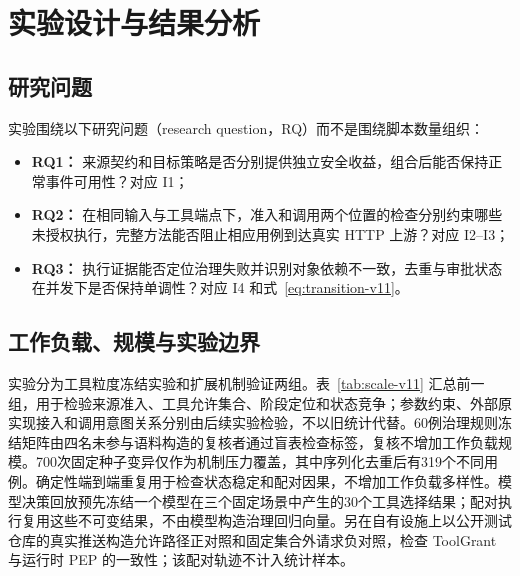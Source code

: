\section{实验设计与结果分析}\label{sec:evaluation-v11}

\subsection{研究问题}

实验围绕以下研究问题（research question，RQ）而不是围绕脚本数量组织：
\begin{itemize}
  \item \textbf{RQ1：} 来源契约和目标策略是否分别提供独立安全收益，组合后能否保持正常事件可用性？对应 I1；
  \item \textbf{RQ2：} 在相同输入与工具端点下，准入和调用两个位置的检查分别约束哪些未授权执行，完整方法能否阻止相应用例到达真实 HTTP 上游？对应 I2--I3；
  \item \textbf{RQ3：} 执行证据能否定位治理失败并识别对象依赖不一致，去重与审批状态在并发下是否保持单调性？对应 I4 和式~\eqref{eq:transition-v11}。
\end{itemize}

\subsection{工作负载、规模与实验边界}

实验分为工具粒度冻结实验和扩展机制验证两组。表~\ref{tab:scale-v11} 汇总前一组，用于检验来源准入、工具允许集合、阶段定位和状态竞争；参数约束、外部原实现接入和调用意图关系分别由后续实验检验，不以旧统计代替。60例治理规则冻结矩阵由四名未参与语料构造的复核者通过盲表检查标签，复核不增加工作负载规模。700次固定种子变异仅作为机制压力覆盖，其中序列化去重后有319个不同用例。确定性端到端重复用于检查状态稳定和配对因果，不增加工作负载多样性。模型决策回放预先冻结一个模型在三个固定场景中产生的30个工具选择结果；配对执行复用这些不可变结果，不由模型构造治理回归向量。另在自有设施上以公开测试仓库的真实推送构造允许路径正对照和固定集合外请求负对照，检查 ToolGrant 与运行时 PEP 的一致性；该配对轨迹不计入统计样本。


